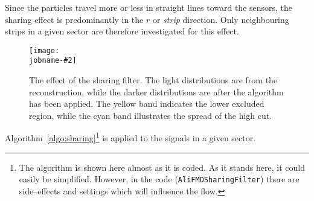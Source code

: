 \documentclass[compat,11pt]{alicenote}
\newcommand\figinput[2][\textwidth]{%
  \texttt{[image: \\jobname-\#2]}}
\begin{document}
\iffalse
The effect is most pronounced in low--flux\footnote{Events with a low
  hit density.} events, like proton--proton collisions or peripheral
Pb--Pb collisions, while in high--flux events the hit density is so
high that most likely each and every strip will be hit and the effect
cancels out on average.
\fi

Since the particles travel more or less in straight lines toward the
\FMD{} sensors, the sharing effect is predominantly in the $r$ or
\emph{strip} direction.  Only neighbouring strips in a given sector are
therefore investigated for this effect.  

\begin{figure}[htbp]
  \centering
  \figinput[.8\linewidth]{sharing}
  \caption{The effect of the sharing filter.  The light distributions
    are from the reconstruction, while the darker distributions are
    after the algorithm has been applied.  The yellow band indicates
    the lower excluded region, while the cyan band illustrates the
    spread of the high cut. }
  \label{fig:sharing:effect}
\end{figure}


Algorithm~\ref{algo:sharing}\footnote{The algorithm is shown here
  almost as it is coded.  As it stands here, it could easily be
  simplified.  However, in the code (\texttt{AliFMDSharingFilter})
  there are side--effects and settings which will influence the flow.}
is applied to the signals in a given sector.
\end{document}
